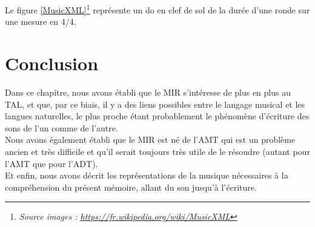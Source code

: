 Le figure \ref{MusicXML}\footnote
    {\textit{Source images : \url{https://fr.wikipedia.org/wiki/MusicXML}}}
représente un do en clef de sol de la durée d’une ronde sur une mesure en 4/4.


\section*{Conclusion}
Dans ce chapitre, nous avons établi que le MIR s’intéresse de plus en plus au TAL, et que, par ce biais, il y a des liens possibles entre le langage musical et les langues naturelles, le plus proche étant probablement le phénomène d’écriture des sons de l’un comme de l’autre.\\
Nous avons également établi que le MIR est né de l’AMT qui est un problème ancien et très difficile et qu’il serait toujours très utile de le résoudre (autant pour l’AMT que pour l’ADT).\\
Et enfin, nous avons décrit les représentations de la musique nécessaires à la compréhension du présent mémoire, allant du son jusqu’à l’écriture.
